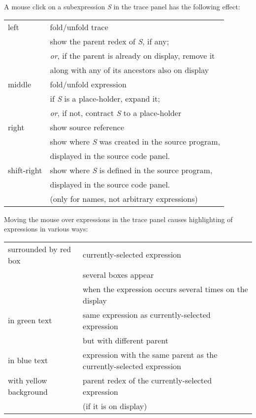 \documentclass[12pt]{article}
\begin{document}
A mouse click on a subexpression \emph{S} in the trace panel has the following effect:

\begin{center}
\begin{tabular}{ll}
left &
fold/unfold trace\\
&\quad show the parent redex of \emph{S}, if any;\\
&\quad \emph{or}, if the parent is already on
display, remove it\\ 
&\quad along with any of its
ancestors also on display
\\
middle &
fold/unfold expression\\
&\quad if \emph{S} is a place-holder, expand it;\\
&\quad \emph{or}, if not, contract \emph{S} to a
place-holder
\\
right &
show source reference\\
&\quad show where \emph{S} was created in the
source program,\\
&\quad displayed in the source code panel.
\\
shift-right &
\quad show where \emph{S} is defined in the source program,\\ 
&\quad displayed in the source code panel.\\
&\quad (only for names, not arbitrary expressions)
\end{tabular}
\end{center}

\noindent
Moving the mouse over expressions in the trace panel causes highlighting of expressions in various ways:

\begin{center}
\begin{tabular}{ll}
surrounded by red box & currently-selected expression \\
& several boxes appear\\
& when the expression occurs several times on the display \\
in green text & same expression as currently-selected expression \\
& but with different parent \\
in blue text & expression with the same parent as the currently-selected expression \\
with yellow background & parent redex of the currently-selected expression\\
& (if it is on display)
\end{tabular}
\end{center}
\end{document}
